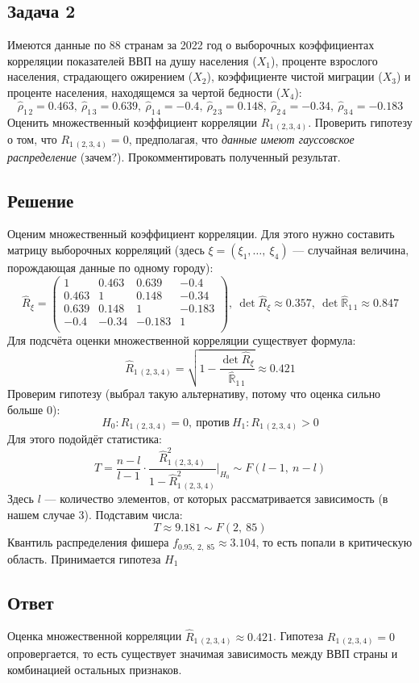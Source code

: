 \documentclass[12pt, a4paper]{article}
\begin{document}
\subsection*{Задача 2}
Имеются данные по 88 странам за 2022 год о выборочных коэффициентах корреляции показателей ВВП на душу населения ($X_1$), проценте взрослого населения, страдающего ожирением ($X_2$), коэффициенте чистой миграции ($X_3$) и проценте населения, находящемся за чертой бедности ($X_4$): 
\[
\hat \rho_{1\, 2} = 0.463,\ \hat \rho_{1\, 3} = 0.639,\ \hat \rho_{1\, 4} = -0.4,\ \hat \rho_{2\, 3} = 0.148,\ \hat\rho_{2\, 4} = -0.34,\ \hat \rho_{3\, 4} = -0.183
\]
Оценить множественный коэффициент корреляции $R_{1\, (2, 3, 4)}$. Проверить гипотезу о том, что $R_{1\, (2, 3, 4)} = 0$, предполагая, что \textit{данные имеют гауссовское распределение} (зачем?). Прокомментировать полученный результат.
\subsection*{Решение}
Оценим множественный коэффициент корреляции. Для этого нужно составить матрицу выборочных корреляций (здесь $\xi = (\xi_1,\dots,\ \xi_4)$ --- случайная величина, порождающая данные по одному городу):
\[
\hat R_{\xi} = \begin{pmatrix}
    1     & 0.463 & 0.639 & -0.4\\
    0.463 & 1     & 0.148 & -0.34 \\
    0.639 & 0.148 & 1     & -0.183 \\
    -0.4  & -0.34 & -0.183& 1 \\
\end{pmatrix},\ \det \hat R_{\xi} \approx 0.357,\ \det \hat {\mathbb{R}}_{1\, 1} \approx 0.847
\]
Для подсчёта оценки множественной корреляции существует формула:
\[
\hat R_{1\, (2, 3, 4)} = \sqrt{1 - \frac{\det \hat R_{\xi}}{\hat {\mathbb{R}}_{1\, 1}} } \approx 0.421
\]
Проверим гипотезу (выбрал такую альтернативу, потому что оценка сильно больше 0):
\[
H_0: R_{1\, (2, 3, 4)} = 0,\ \text{против}\ H_1: R_{1\, (2, 3, 4)} > 0
\]
Для этого подойдёт статистика:
\[
T = \frac{n - l}{l - 1} \cdot  \frac{\hat R_{1\, (2, 3, 4)}^2}{1 - \hat R_{1\, (2, 3, 4)}^2} \Bigg|_{H_0} \sim F(l - 1,\ n - l)
\]
Здесь $l$ --- количество элементов, от которых рассматривается зависимость (в нашем случае 3). Подставим числа:
\[
T \approx 9.181 \sim F(2,\ 85)
\]
Квантиль распределения фишера $f_{0.95,\ 2,\ 85} \approx 3.104$, то есть попали в критическую область. Принимается гипотеза $H_1$
\subsection*{Ответ}
Оценка множественной корреляции $\hat R_{1\, (2, 3, 4)} \approx 0.421$. Гипотеза $R_{1\, (2, 3, 4)} = 0$ опровергается, то есть существует значимая зависимость между ВВП страны и комбинацией остальных признаков.
\end{document}
